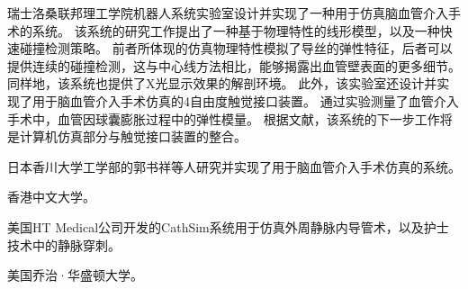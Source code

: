 瑞士洛桑联邦理工学院机器人系统实验室设计并实现了一种用于仿真脑血管介入手术的系统\cite{Wang2007EPFL}\cite{Ilic2005EPFL}\cite{Moix2005EPFL}\cite{Ilic2005aEPFL}\cite{Ilic2005bEPFL}。
该系统的研究工作提出了一种基于物理特性的线形模型，以及一种快速碰撞检测策略\cite{Wang2007EPFL}。
前者所体现的仿真物理特性模拟了导丝的弹性特征，后者可以提供连续的碰撞检测，这与中心线方法相比，能够揭露出血管壁表面的更多细节。
同样地，该系统也提供了X光显示效果的解剖环境。
此外，该实验室还设计并实现了用于脑血管介入手术仿真的4自由度触觉接口装置\cite{Ilic2005EPFL}\cite{Moix2005EPFL}\cite{Ilic2005aEPFL}。
通过实验测量了血管介入手术中，血管因球囊膨胀过程中的弹性模量\cite{Ilic2005bEPFL}。
根据文献\cite{Wang2007EPFL}，该系统的下一步工作将是计算机仿真部分与触觉接口装置的整合。

日本香川大学工学部的郭书祥等人研究并实现了用于脑血管介入手术仿真的系统\cite{Gao2012GUO}\cite{Gao2012aGUO}\cite{Gao2012bGUO}。

香港中文大学\cite{cuhkweb}\cite{guo2007CUHK}\cite{Chui2010CUHK}。

美国HT Medical公司开发的CathSim系统用于仿真外周静脉内导管术\cite{ursino1999cathsim}，以及护士技术中的静脉穿刺\cite{Barker1999CathSim}。

美国乔治·华盛顿大学\cite{Hahn1998GWU}。

